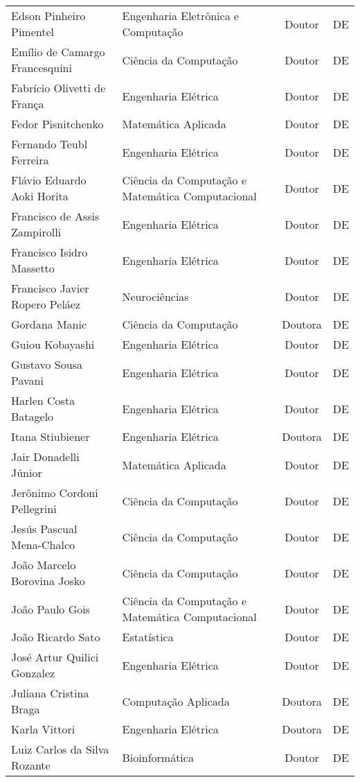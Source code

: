 \begin{longtable}{|l|l|c|c|}
    Edson Pinheiro Pimentel & Engenharia Eletrônica e Computação & Doutor & DE \\
    Emílio de Camargo Francesquini & Ciência da Computação & Doutor & DE \\
    Fabrício Olivetti de França & Engenharia Elétrica & Doutor & DE \\
    Fedor Pisnitchenko & Matemática Aplicada & Doutor & DE \\
    Fernando Teubl Ferreira & Engenharia Elétrica & Doutor & DE \\
    Flávio Eduardo Aoki Horita & Ciência da Computação e Matemática Computacional & Doutor & DE \\
    Francisco de Assis Zampirolli & Engenharia Elétrica & Doutor & DE \\
    Francisco Isidro Massetto & Engenharia Elétrica & Doutor & DE \\
    Francisco Javier Ropero Peláez & Neurociências & Doutor & DE \\
    Gordana Manic & Ciência da Computação & Doutora & DE \\
    Guiou Kobayashi & Engenharia Elétrica & Doutor & DE \\
    Gustavo Sousa Pavani & Engenharia Elétrica & Doutor & DE \\
    Harlen Costa Batagelo & Engenharia Elétrica & Doutor & DE \\
    Itana Stiubiener & Engenharia Elétrica  & Doutora & DE \\
    Jair Donadelli Júnior & Matemática Aplicada & Doutor & DE \\
    Jerônimo Cordoni Pellegrini & Ciência da Computação & Doutor & DE \\
    Jesús Pascual Mena-Chalco & Ciência da Computação & Doutor & DE \\
    João Marcelo Borovina Josko & Ciência da Computação & Doutor & DE \\
    João Paulo Gois & Ciência da Computação e Matemática Computacional & Doutor & DE \\
    João Ricardo Sato & Estatística & Doutor & DE \\
    José Artur Quilici Gonzalez & Engenharia Elétrica & Doutor & DE \\
    Juliana Cristina Braga & Computação Aplicada & Doutora & DE \\
    Karla Vittori & Engenharia Elétrica & Doutora & DE \\
    Luiz Carlos da Silva Rozante & Bioinformática & Doutor & DE \\

\end{longtable}
